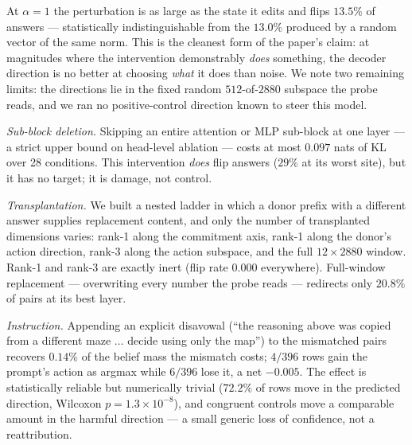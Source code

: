 \documentclass{article}
\begin{document}
At $\alpha = 1$ the perturbation is as large as the state it edits and flips $13.5\%$ of
answers --- statistically indistinguishable from the $13.0\%$ produced by a random vector of
the same norm. This is the cleanest form of the paper's claim: at magnitudes where the
intervention demonstrably \emph{does} something, the decoder direction is no better at
choosing \emph{what} it does than noise. We note two remaining limits: the directions lie in
the fixed random $512$-of-$2880$ subspace the probe reads, and we ran no positive-control
direction known to steer this model.

\emph{Sub-block deletion.} Skipping an entire attention or MLP sub-block at one layer --- a
strict upper bound on head-level ablation --- costs at most $0.097$ nats of KL over 28
conditions. This intervention \emph{does} flip answers ($29\%$ at its worst site), but it
has no target; it is damage, not control.

\emph{Transplantation.} We built a nested ladder in which a donor prefix with a different
answer supplies replacement content, and only the number of transplanted dimensions varies:
rank-1 along the commitment axis, rank-1 along the donor's action direction, rank-3 along
the action subspace, and the full $12\times2880$ window. Rank-1 and rank-3 are exactly
inert (flip rate $0.000$ everywhere). Full-window replacement --- overwriting every number
the probe reads --- redirects only $20.8\%$ of pairs at its best layer.

\emph{Instruction.} Appending an explicit disavowal (``the reasoning above was copied from
a different maze $\ldots$ decide using only the map'') to the mismatched pairs recovers
$0.14\%$ of the belief mass the mismatch costs; $4/396$ rows gain the prompt's action as
argmax while $6/396$ lose it, a net $-0.005$. The effect is statistically reliable but
numerically trivial ($72.2\%$ of rows move in the predicted direction, Wilcoxon
$p = 1.3{\times}10^{-8}$), and congruent controls move a comparable amount in the harmful
direction --- a small generic loss of confidence, not a reattribution.
\end{document}
